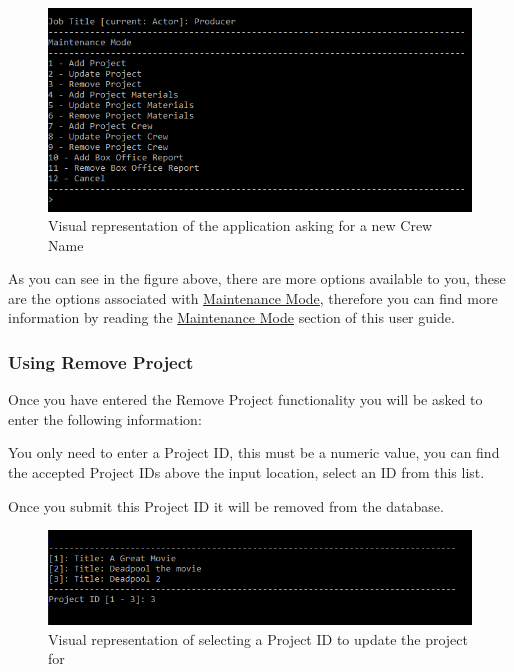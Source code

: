 \documentclass[
  english,
  a4paper,
,tablecaptionabove
]{scrartcl}
\begin{document}
\begin{figure}
\centering
\includegraphics{images/user-guide/maintenance-mode/update-crew-job-title.png}
\caption{Visual representation of the application asking for a new Crew
Name}
\end{figure}

As you can see in the figure above, there are more options available to
you, these are the options associated with
\protect\hyperlink{using-maintenance-mode}{Maintenance Mode}, therefore
you can find more information by reading the
\protect\hyperlink{using-maintenance-mode}{Maintenance Mode} section of
this user guide.

\newpage

\hypertarget{using-remove-project}{%
\subsubsection{Using Remove Project}\label{using-remove-project}}

Once you have entered the Remove Project functionality you will be asked
to enter the following information:

You only need to enter a Project ID, this must be a numeric value, you
can find the accepted Project IDs above the input location, select an ID
from this list.

Once you submit this Project ID it will be removed from the database.

\begin{figure}
\centering
\includegraphics{images/user-guide/maintenance-mode/remove-project-select-id.png}
\caption{Visual representation of selecting a Project ID to update the
project for}
\end{figure}
\end{document}
